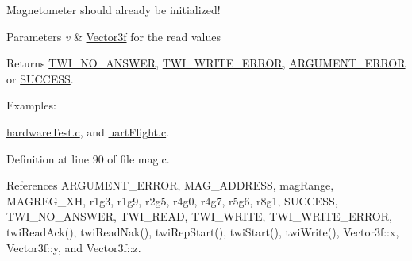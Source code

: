 Magnetometer should already be initialized! 
\begin{DoxyParams}{Parameters}
{\em v} & \hyperlink{struct_vector3f}{Vector3f} for the read values \\
\hline
\end{DoxyParams}
\begin{DoxyReturn}{Returns}
\hyperlink{group__error_gga2c3e4bb40f36b262a5214e2da2bca9c5a04d5943ba652af2205c88b247e0c659c}{T\-W\-I\-\_\-\-N\-O\-\_\-\-A\-N\-S\-W\-E\-R}, \hyperlink{group__error_gga2c3e4bb40f36b262a5214e2da2bca9c5ac0e3b3463dcaf220e54794b4711708c9}{T\-W\-I\-\_\-\-W\-R\-I\-T\-E\-\_\-\-E\-R\-R\-O\-R}, \hyperlink{group__error_gga2c3e4bb40f36b262a5214e2da2bca9c5a49ccf277a69dd938c591928aa27c66cc}{A\-R\-G\-U\-M\-E\-N\-T\-\_\-\-E\-R\-R\-O\-R} or \hyperlink{group__error_gga2c3e4bb40f36b262a5214e2da2bca9c5ac7f69f7c9e5aea9b8f54cf02870e2bf8}{S\-U\-C\-C\-E\-S\-S}. 
\end{DoxyReturn}
\begin{Desc}
\item[Examples\-: ]\par
\hyperlink{hardware_test_8c-example}{hardware\-Test.\-c}, and \hyperlink{uart_flight_8c-example}{uart\-Flight.\-c}.\end{Desc}


Definition at line 90 of file mag.\-c.



References A\-R\-G\-U\-M\-E\-N\-T\-\_\-\-E\-R\-R\-O\-R, M\-A\-G\-\_\-\-A\-D\-D\-R\-E\-S\-S, mag\-Range, M\-A\-G\-R\-E\-G\-\_\-\-X\-H, r1g3, r1g9, r2g5, r4g0, r4g7, r5g6, r8g1, S\-U\-C\-C\-E\-S\-S, T\-W\-I\-\_\-\-N\-O\-\_\-\-A\-N\-S\-W\-E\-R, T\-W\-I\-\_\-\-R\-E\-A\-D, T\-W\-I\-\_\-\-W\-R\-I\-T\-E, T\-W\-I\-\_\-\-W\-R\-I\-T\-E\-\_\-\-E\-R\-R\-O\-R, twi\-Read\-Ack(), twi\-Read\-Nak(), twi\-Rep\-Start(), twi\-Start(), twi\-Write(), Vector3f\-::x, Vector3f\-::y, and Vector3f\-::z.


